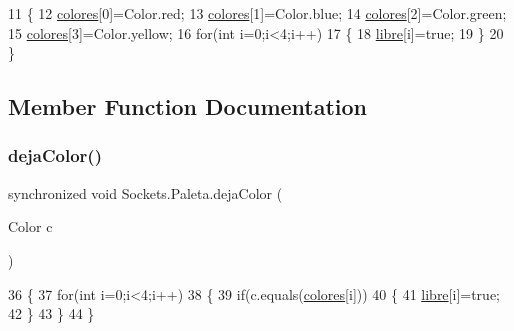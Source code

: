 \begin{DoxyCode}
11     \{
12         \mbox{\hyperlink{class_sockets_1_1_paleta_ad5cfd090a42fa589849afd28beebf4e5}{colores}}[0]=Color.red;
13         \mbox{\hyperlink{class_sockets_1_1_paleta_ad5cfd090a42fa589849afd28beebf4e5}{colores}}[1]=Color.blue;
14         \mbox{\hyperlink{class_sockets_1_1_paleta_ad5cfd090a42fa589849afd28beebf4e5}{colores}}[2]=Color.green;
15         \mbox{\hyperlink{class_sockets_1_1_paleta_ad5cfd090a42fa589849afd28beebf4e5}{colores}}[3]=Color.yellow;
16         \textcolor{keywordflow}{for}(\textcolor{keywordtype}{int} i=0;i<4;i++)
17         \{
18             \mbox{\hyperlink{class_sockets_1_1_paleta_a836bc075d6bc794fbd6002483dda1534}{libre}}[i]=\textcolor{keyword}{true};
19         \}
20     \}
\end{DoxyCode}


\subsection{Member Function Documentation}
\mbox{\label{class_sockets_1_1_paleta_aef920b8ba5dcf546887e48fe95dde588}} 
\subsubsection{\texorpdfstring{deja\+Color()}{dejaColor()}}
{\footnotesize\ttfamily synchronized void Sockets.\+Paleta.\+deja\+Color (\begin{DoxyParamCaption}\item[{Color}]{c }\end{DoxyParamCaption})\hspace{0.3cm}{\ttfamily [inline]}}


\begin{DoxyCode}
36     \{
37         \textcolor{keywordflow}{for}(\textcolor{keywordtype}{int} i=0;i<4;i++)
38         \{
39             \textcolor{keywordflow}{if}(c.equals(\mbox{\hyperlink{class_sockets_1_1_paleta_ad5cfd090a42fa589849afd28beebf4e5}{colores}}[i]))
40             \{
41                 \mbox{\hyperlink{class_sockets_1_1_paleta_a836bc075d6bc794fbd6002483dda1534}{libre}}[i]=\textcolor{keyword}{true};
42             \}
43         \}
44     \}
\end{DoxyCode}
\mbox{\label{class_sockets_1_1_paleta_a84e276825a78a7a716c088e1e4306c70}} 

